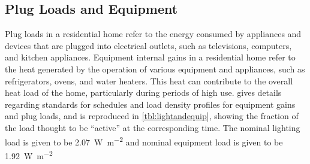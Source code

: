 \subsection{Plug Loads and Equipment}
Plug loads in a residential home refer to the energy consumed by appliances and devices that are plugged into electrical outlets, such as televisions, computers, and kitchen appliances. Equipment internal gains in a residential home refer to the heat generated by the operation of various equipment and appliances, such as refrigerators, ovens, and water heaters. This heat can contribute to the overall heat load of the home, particularly during periods of high use.  gives details regarding standards for schedules and load density profiles for equipment gains and plug loads, and is reproduced in \cref{tbl:lightandequip}, showing the fraction of the load thought to be ``active'' at the corresponding time. The nominal lighting load is given to be \qty{2.07}{\watt\per\square\meter} and nominal equipment load is given to be \qty{1.92}{\watt\per\square\meter}

